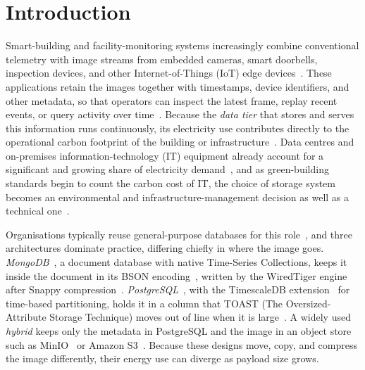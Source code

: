\documentclass[pdflatex,sn-basic]{sn-jnl}%
\begin{document}
\maketitle

\par\medskip


\section{Introduction}\label{sec:introduction}

{\color{markup}Smart-building and facility-monitoring systems increasingly combine conventional telemetry with image streams from embedded cameras, smart doorbells, inspection devices, and other Internet-of-Things (IoT) edge devices~\citep{bajera_iot_smart_buildings,alfuqaha_iot_survey,saputri_building_monitoring}.} {\color{markup}These applications retain the images together with timestamps, device identifiers, and other metadata, so that operators can inspect the latest frame, replay recent events, or query activity over time~\citep{ceec_tsdb_review,jensen_tsms_survey,halim_iot_telemetry_sharing}.} {\color{markup}Because the \emph{data tier} that stores and serves this information runs continuously, its electricity use contributes directly to the operational carbon footprint of the building or infrastructure~\citep{nerc_tsdb_survey}.} {\color{markup}Data centres and on-premises information-technology (IT) equipment already account for a significant and growing share of electricity demand~\citep{masanet_datacenter_energy,shehabi_us_datacenter}, and as green-building standards begin to count the carbon cost of IT, the choice of storage system becomes an environmental and infrastructure-management decision as well as a technical one~\citep{ieee_ce_definition}.}

{\color{markup}Organisations typically reuse general-purpose databases for this role~\citep{intuz_iot_databases}, and three architectures dominate practice, differing chiefly in where the image goes.} {\color{markup}\emph{MongoDB}~\citep{mongodb_official}, a document database with native Time-Series Collections, keeps it inside the document in its BSON encoding~\citep{mongodb_bson_spec}, written by the WiredTiger engine~\citep{mongodb_wiredtiger_storage} after Snappy compression~\citep{google_snappy}.} {\color{markup}\emph{PostgreSQL}~\citep{postgresql_official}, with the TimescaleDB extension~\citep{timescaledb_official} for time-based partitioning, holds it in a column that TOAST (The Oversized-Attribute Storage Technique) moves out of line when it is large~\citep{postgresql_toast_docs}.} {\color{markup}A widely used \emph{hybrid} keeps only the metadata in PostgreSQL and the image in an object store such as MinIO~\citep{minio_official} or Amazon S3~\citep{aws_s3_official}.} {\color{markup}Because these designs move, copy, and compress the image differently, their energy use can diverge as payload size grows.}
\end{document}
